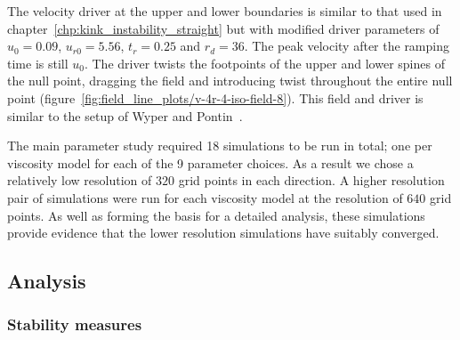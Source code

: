 The velocity driver at the upper and lower boundaries is similar to that used in chapter~\ref{chp:kink_instability_straight} but with modified driver parameters of $u_0 = 0.09$, $u_{r0} = 5.56$, $t_r = 0.25$ and $r_d = 36$. The peak velocity after the ramping time is still $u_0$. The driver twists the footpoints of the upper and lower spines of the null point, dragging the field and introducing twist throughout the entire null point (figure~\ref{fig:field_line_plots/v-4r-4-iso-field-8}). This field and driver is similar to the setup of Wyper and Pontin~\cite{wyperKelvinHelmholtzInstabilityCurrentvortex2013}.

The main parameter study required 18 simulations to be run in total; one per viscosity model for each of the 9 parameter choices. As a result we chose a relatively low resolution of $320$ grid points in each direction. A higher resolution pair of simulations were run for each viscosity model at the resolution of $640$ grid points. As well as forming the basis for a detailed analysis, these simulations provide evidence that the lower resolution simulations have suitably converged. 

\subsection{Analysis}

\subsubsection{Stability measures}

\label{sec:stability_measures}

